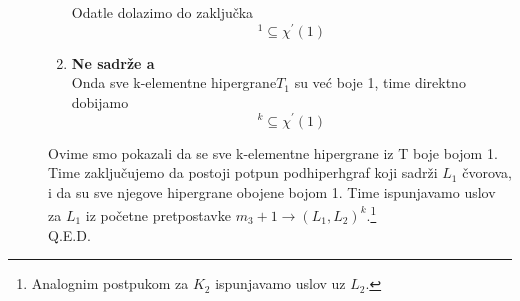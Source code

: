 \documentclass[a4paper]{article}
\begin{document}
\begin{description}
\begin{enumerate}
				Odatle dolazimo do zaključka 
				\begin{equation}
					[ T ]^{1} \subseteq \chi^\prime (1)
				\end{equation}
			\item  \textbf{Ne sadrže a} \\
				Onda sve k-elementne hipergrane$T_1$ su već boje 1, time direktno dobijamo
				\begin{equation}
					[ T ]^k \subseteq \chi^\prime (1)
				\end{equation}
		\end{enumerate}
		Ovime smo pokazali da se sve k-elementne hipergrane iz T boje bojom 1. Time zaključujemo da postoji potpun podhiperhgraf koji sadrži $L_1$ čvorova, i da su sve njegove hipergrane obojene bojom 1. Time ispunjavamo uslov za $L_1$ iz početne pretpostavke $m_3 + 1 \rightarrow (L_1, L_2)^k$.\footnote{Analognim postpukom za $K_2$ ispunjavamo uslov uz $L_2$.}\\
		{\large Q.E.D.}
	\end{description}
\end{document}
